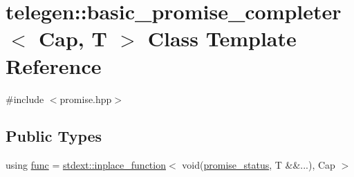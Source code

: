 \hypertarget{classtelegen_1_1basic__promise__completer}{}\section{telegen\+:\+:basic\+\_\+promise\+\_\+completer$<$ Cap, T $>$ Class Template Reference}
\label{classtelegen_1_1basic__promise__completer}


{\ttfamily \#include $<$promise.\+hpp$>$}

\subsection*{Public Types}
\begin{DoxyCompactItemize}
\item 
using \hyperlink{classtelegen_1_1basic__promise__completer_a0f689589e2a64063b01ea7a4268e8cfe}{func} = \hyperlink{classstdext_1_1inplace__function}{stdext\+::inplace\+\_\+function}$<$ void(\hyperlink{namespacetelegen_a51e8b7480c7247182e2c6ca35e2c7504}{promise\+\_\+status}, T \&\&...), Cap $>$
\end{DoxyCompactItemize}
